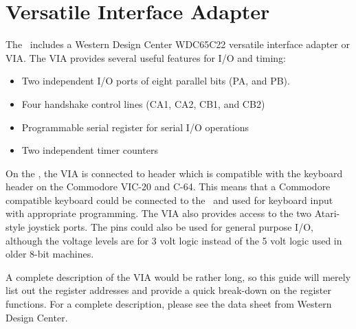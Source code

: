 \chapter{Versatile Interface Adapter}

The \jr\ includes a Western Design Center WDC65C22 versatile interface adapter or VIA. The VIA provides several useful features for I/O and timing:

\begin{itemize}
    \item Two independent I/O ports of eight parallel bits (PA, and PB).

    \item Four handshake control lines (CA1, CA2, CB1, and CB2)

    \item Programmable serial register for serial I/O operations

    \item Two independent timer counters
\end{itemize}

On the \jr, the VIA is connected to header which is compatible with the keyboard header on the Commodore VIC-20 and C-64. This means that a Commodore compatible keyboard could be connected to the \jr\ and used for keyboard input with appropriate programming. The VIA also provides access to the two Atari-style joystick ports. The pins could also be used for general purpose I/O, although the voltage levels are for 3 volt logic instead of the 5 volt logic used in older 8-bit machines.

A complete description of the VIA would be rather long, so this guide will merely list out the register addresses and provide a quick break-down on the register functions. For a complete description, please see the data sheet from Western Design Center.

